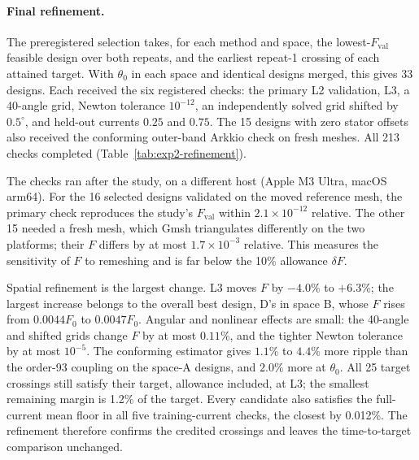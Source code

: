 \begin{table}[H]\centering\small
\caption{Charged wall-time units to the first attaining validation,
repeat~1. A dash means the target was not attained within 120 units.
$T_{99}$ was attained by no run in space A.}
\label{tab:exp2-time}
\end{table}

\begin{table}[H]\centering\small
\caption{Paired per-start time ratios (repeat~1). B/A and D/E vary the
optimizer at fixed resolution; E/A and D/B vary the resolution; D/A
compares A with the coarse derivative-free competitor. Ratios above one
favor the denominator. Geometric means use the finite pairs only.}
\label{tab:exp2-ratios}
\end{table}

\paragraph{Final refinement.}
The preregistered selection takes, for each method and space, the
lowest-$F_{\mathrm{val}}$ feasible design over both repeats, and the
earliest repeat-1 crossing of each attained target. With $\theta_0$ in
each space and identical designs merged, this gives 33 designs. Each
received the six registered checks: the primary L2 validation, L3, a
40-angle grid, Newton tolerance $10^{-12}$, an independently solved grid
shifted by $0.5^\circ$, and held-out currents $0.25$ and $0.75$. The 15
designs with zero stator offsets also received the conforming outer-band
Arkkio check on fresh meshes. All 213 checks completed
(Table~\ref{tab:exp2-refinement}).

The checks ran after the study, on a different host (Apple M3 Ultra,
macOS arm64). For the 16 selected designs validated on the moved
reference mesh, the primary check reproduces the study's $F_{\mathrm{val}}$
within $2.1\times10^{-12}$ relative. The other 15 needed a fresh mesh,
which Gmsh triangulates differently on the two platforms; their $F$
differs by at most $1.7\times10^{-3}$ relative. This measures the
sensitivity of $F$ to remeshing and is far below the 10\% allowance
$\delta F$.

Spatial refinement is the largest change. L3 moves $F$ by $-4.0\%$ to
$+6.3\%$; the largest increase belongs to the overall best design, D's in
space B, whose $F$ rises from $0.0044F_0$ to $0.0047F_0$. Angular and
nonlinear effects are small: the 40-angle and shifted grids change $F$ by
at most $0.11\%$, and the tighter Newton tolerance by at most $10^{-5}$.
The conforming estimator gives $1.1\%$ to $4.4\%$ more ripple than the
order-93 coupling on the space-A designs, and $2.0\%$ more at $\theta_0$.
All 25 target crossings still satisfy their target, allowance included,
at L3; the smallest remaining margin is 1.2\% of the target. Every
candidate also satisfies the full-current mean floor in all five
training-current checks, the closest by 0.012\%. The refinement therefore
confirms the credited crossings and leaves the time-to-target comparison
unchanged.

